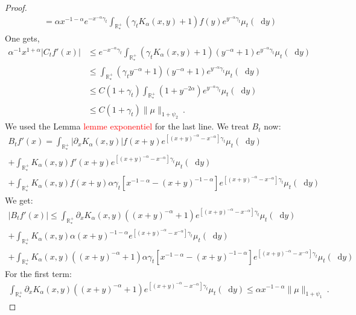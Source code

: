 \documentclass[11pt,a4paper]{article}
\newcommand{\RRP}{\mathbb{R}^+_*}
\newcommand{\red}[1]{\textcolor{red}{#1}}
\newcommand{\dd}{\mathop{}\!\mathrm{d}}
\begin{document}
\begin{proof}
\begin{align*}
        &= \alpha x^{-1-\alpha}e^{-x^{-\alpha}\gamma_t}\int_{\RRP}(\gamma_t K_\alpha(x,y) + 1) f(y)e^{y^{-\alpha}\gamma_t} \mu_t(\dd y)
    \end{align*}
    One gets,
    \begin{align*}
        \alpha^{-1} x^{1+\alpha}|C_tf'(x) | 
        &\leq e^{-x^{-\alpha}\gamma_t}\int_{\RRP}(\gamma_t K_\alpha(x,y) + 1) (y^{-\alpha} + 1)e^{y^{-\alpha}\gamma_t} \mu_t(\dd y) \\
        &\leq \int_{\RRP}(\gamma_t y^{-\alpha} + 1) (y^{-\alpha} + 1)e^{y^{-\alpha}\gamma_t} \mu_t(\dd y)\\
        &\leq C(1 + \gamma_t )\int_{\RRP}(1 + y^{-2\alpha}) e^{y^{-\alpha}\gamma_t} \mu_t(\dd y)\\
        &\leq C(1 + \gamma_t )\|\mu\|_{1 + \psi_2}\ .
    \end{align*}
    We used the Lemma \red{lemme exponentiel} for the last line. We treat $B_t$ now:
    \begin{multline*}
        B_tf'(x) = \int_{\RRP}\left|\partial_x K_\alpha(x,y )\right|f(x+y) e^{\left[(x+y)^{-\alpha}-x^{-\alpha}\right]\gamma_t }\mu_t(\dd y) \\
        + \int_{\RRP}K_\alpha(x,y)f'(x+y) e^{\left[(x+y)^{-\alpha}-x^{-\alpha}\right]\gamma_t }\mu_t(\dd y) \\
        + \int_{\RRP}K_\alpha(x,y)f(x+y)\alpha\gamma_t\left[x^{-1-\alpha} -(x+y)^{-1-\alpha}\right] e^{\left[(x+y)^{-\alpha}-x^{-\alpha}\right]\gamma_t }\mu_t(\dd y)
    \end{multline*}
    We get:
    \begin{multline*}
        |B_tf'(x)| \leq \int_{\RRP}\partial_x K_\alpha(x,y )\left((x+y)^{-\alpha} + 1\right) e^{\left[(x+y)^{-\alpha}-x^{-\alpha}\right]\gamma_t }\mu_t(\dd y) \\
        + \int_{\RRP}K_\alpha(x,y)\alpha (x+y)^{-1-\alpha}e^{\left[(x+y)^{-\alpha}-x^{-\alpha}\right]\gamma_t }\mu_t(\dd y) \\
        + \int_{\RRP}K_\alpha(x,y)\left((x+y)^{-\alpha} + 1\right)\alpha\gamma_t\left[x^{-1-\alpha} -(x+y)^{-1-\alpha}\right] e^{\left[(x+y)^{-\alpha}-x^{-\alpha}\right]\gamma_t }\mu_t(\dd y)
    \end{multline*}
    For the first term:
    \begin{align*}
        \int_{\RRP}\partial_x K_\alpha(x,y )\left((x+y)^{-\alpha} + 1\right) e^{\left[(x+y)^{-\alpha}-x^{-\alpha}\right]\gamma_t }\mu_t(\dd y) \leq \alpha x^{-1-\alpha}\|\mu\|_{1 + \psi_1}\ .
    \end{align*}

\end{proof}
\end{document}

